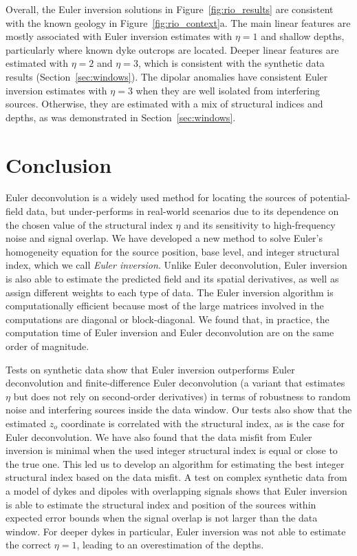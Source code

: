 Overall, the Euler inversion solutions in Figure~\ref{fig:rio_results} are consistent with the known geology in Figure~\ref{fig:rio_context}a.
The main linear features are mostly associated with Euler inversion estimates with $\eta=1$ and shallow depths, particularly where known dyke outcrops are located.
Deeper linear features are estimated with $\eta=2$ and $\eta=3$, which is consistent with the synthetic data results (Section~\ref{sec:windows}).
The dipolar anomalies have consistent Euler inversion estimates with $\eta=3$ when they are well isolated from interfering sources.
Otherwise, they are estimated with a mix of structural indices and depths, as was demonstrated in Section~\ref{sec:windows}.

\section{Conclusion}

Euler deconvolution is a widely used method for locating the sources of potential-field data, but under-performs in real-world scenarios due to its dependence on the chosen value of the structural index $\eta$ and its sensitivity to high-frequency noise and signal overlap.
We have developed a new method to solve Euler's homogeneity equation for the source position, base level, and integer structural index, which we call \textit{Euler inversion}.
Unlike Euler deconvolution, Euler inversion is also able to estimate the predicted field and its spatial derivatives, as well as assign different weights to each type of data.
The Euler inversion algorithm is computationally efficient because most of the large matrices involved in the computations are diagonal or block-diagonal.
We found that, in practice, the computation time of Euler inversion and Euler deconvolution are on the same order of magnitude.

Tests on synthetic data show that Euler inversion outperforms Euler deconvolution and finite-difference Euler deconvolution (a variant that estimates $\eta$ but does not rely on second-order derivatives) in terms of robustness to random noise and interfering sources inside the data window.
Our tests also show that the estimated $z_o$ coordinate is correlated with the structural index, as is the case for Euler deconvolution.
We have also found that the data misfit from Euler inversion is minimal when the used integer structural index is equal or close to the true one.
This led us to develop an algorithm for estimating the best integer structural index based on the data misfit.
A test on complex synthetic data from a model of dykes and dipoles with overlapping signals shows that Euler inversion is able to estimate the structural index and position of the sources within expected error bounds when the signal overlap is not larger than the data window.
For deeper dykes in particular, Euler inversion was not able to estimate the correct $\eta=1$, leading to an overestimation of the depths.

